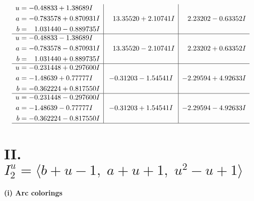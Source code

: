 \documentclass[1p]{elsarticle_modified}
\theoremstyle{definition}
\begin{document}
$$\begin{array}{c|c|c}
\begin{aligned}
u &= -0.48833 + 1.38689 I \\
a &= -0.783578 + 0.870931 I \\
b &= \phantom{-}1.031440 - 0.889735 I\end{aligned}
 & \phantom{-}13.35520 + 2.10741 I & \phantom{-}2.23202 - 0.63352 I \\ \hline\begin{aligned}
u &= -0.48833 - 1.38689 I \\
a &= -0.783578 - 0.870931 I \\
b &= \phantom{-}1.031440 + 0.889735 I\end{aligned}
 & \phantom{-}13.35520 - 2.10741 I & \phantom{-}2.23202 + 0.63352 I \\ \hline\begin{aligned}
u &= -0.231448 + 0.297600 I \\
a &= -1.48639 + 0.77777 I \\
b &= -0.362224 + 0.817550 I\end{aligned}
 & -0.31203 - 1.54541 I & -2.29594 + 4.92633 I \\ \hline\begin{aligned}
u &= -0.231448 - 0.297600 I \\
a &= -1.48639 - 0.77777 I \\
b &= -0.362224 - 0.817550 I\end{aligned}
 & -0.31203 + 1.54541 I & -2.29594 - 4.92633 I\\
 \hline 
 \end{array}$$\newpage\newpage\renewcommand{\arraystretch}{1}
\centering \section*{II. $I^u_{2}= \langle b+u-1,\;a+u+1,\;u^2- u+1 \rangle$}
\flushleft \textbf{(i) Arc colorings}\\
\end{document}
